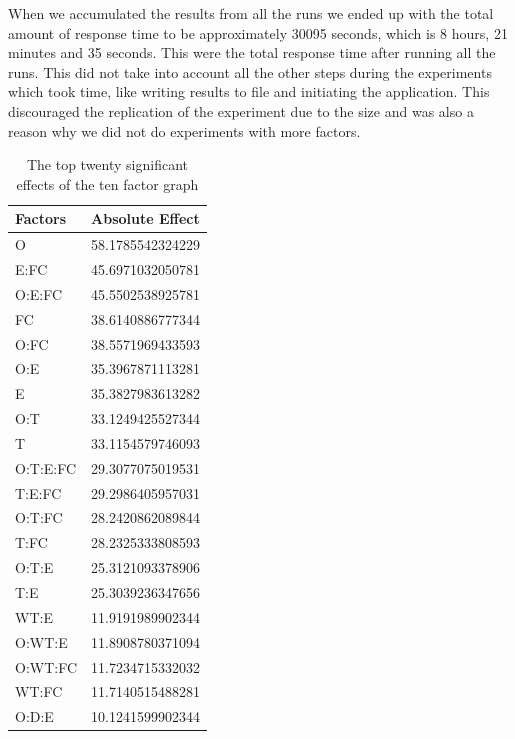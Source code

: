\documentclass{llncs}
\begin{document}
When we accumulated the results from all the runs we ended up with the total 
amount of response time to be approximately 30095 seconds, which is 8 hours, 21 minutes and 35 seconds. 
This were the total response time after running all the runs. This did not take into account all the other 
steps during the experiments which took time, like writing results to file and initiating the application. 
This discouraged the replication of the experiment due to the size and was also a reason why we did not 
do experiments with more factors.




\begin{table}
\begin{center}
    \begin{tabular}{ | l l |}
    \hline
    {\bf Factors} & {\bf Absolute Effect}  \\ \hline
      O & 58.1785542324229 \\ \hline
      E:FC & 45.6971032050781 \\ \hline
      O:E:FC & 45.5502538925781\\ \hline
      FC & 38.6140886777344\\ \hline
      O:FC & 38.5571969433593\\ \hline
      O:E & 35.3967871113281\\ \hline
      E & 35.3827983613282\\ \hline
      O:T & 33.1249425527344\\ \hline
      T & 33.1154579746093\\ \hline
      O:T:E:FC & 29.3077075019531\\ \hline
      T:E:FC & 29.2986405957031\\ \hline
      O:T:FC & 28.2420862089844\\ \hline
      T:FC & 28.2325333808593\\ \hline
      O:T:E & 25.3121093378906\\ \hline
      T:E & 25.3039236347656\\ \hline
      WT:E & 11.9191989902344\\ \hline
      O:WT:E & 11.8908780371094\\ \hline
      O:WT:FC & 11.7234715332032\\ \hline
      WT:FC & 11.7140515488281\\ \hline
      O:D:E & 10.1241599902344\\ \hline
    \end{tabular}
\end{center}
\caption{The top twenty significant effects of the ten factor graph}\label{10factorEffect}
\end{table}
\end{document}
